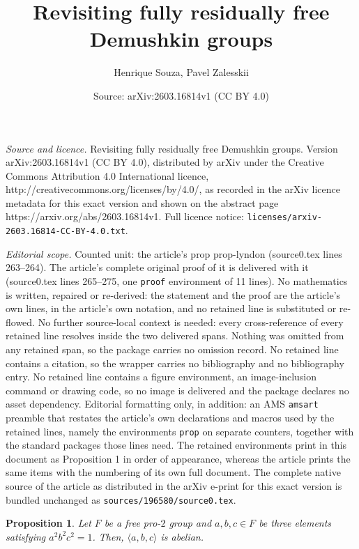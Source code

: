 \documentclass[10pt,a4paper]{amsart}
\title{Revisiting fully residually free Demushkin groups}
\author{Henrique Souza, Pavel Zalesskii}
\date{Source: arXiv:2603.16814v1 (CC BY 4.0)}
\newtheorem{prop}{Proposition}
\begin{document}
\maketitle

\noindent\emph{Source and licence.} Revisiting fully residually free Demushkin groups. Version arXiv:2603.16814v1 (CC BY 4.0), distributed by arXiv under the Creative Commons Attribution 4.0 International licence, http://creativecommons.org/licenses/by/4.0/, as recorded in the arXiv licence metadata for this exact version and shown on the abstract page https://arxiv.org/abs/2603.16814v1. Full licence notice: \texttt{licenses/arxiv-2603.16814-CC-BY-4.0.txt}.\par\smallskip

\noindent\textit{Editorial scope.} Counted unit: the article's prop prop-lyndon (source0.tex lines 263--264). The article's complete original proof of it is delivered with it (source0.tex lines 265--275, one \texttt{proof} environment of 11 lines). No mathematics is written, repaired or re-derived: the statement and the proof are the article's own lines, in the article's own notation, and no retained line is substituted or re-flowed.  No further source-local context is needed: every cross-reference of every retained line resolves inside the two delivered spans.  Nothing was omitted from any retained span, so the package carries no omission record.  No retained line contains a citation, so the wrapper carries no bibliography and no bibliography entry.  No retained line contains a figure environment, an image-inclusion command or drawing code, so no image is delivered and the package declares no asset dependency.  Editorial formatting only, in addition: an AMS \texttt{amsart} preamble that restates the article's own declarations and macros used by the retained lines, namely the environments \texttt{prop} on separate counters, together with the standard packages those lines need.  The retained environments print in this document as Proposition 1 in order of appearance, whereas the article prints the same items with the numbering of its own full document.  The complete native source of the article as distributed in the arXiv e-print for this exact version is bundled unchanged as \texttt{sources/196580/source0.tex}.
\begin{prop}\label{prop-lyndon} Let \(F\) be a free pro-\(2\) group and \(a,b,c \in F\) be three elements satisfying \(a^2b^2c^2 = 1\). Then, \(\langle a,b,c\rangle\) is abelian.
\end{prop}
\end{document}
